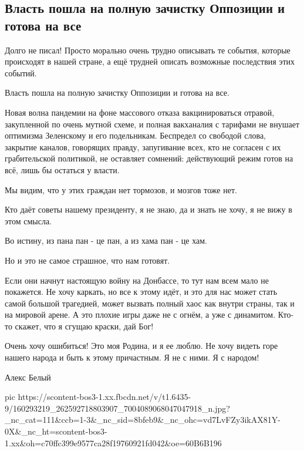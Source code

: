  
 
 
 
 

\subsection{Власть пошла на полную зачистку Оппозиции и готова на все}

Долго не писал! Просто морально очень трудно описывать те события, которые
происходят в нашей стране, а ещё трудней описать возможные последствия этих
событий.  

Власть пошла на полную зачистку Оппозиции и готова на все.

Новая волна пандемии на фоне массового отказа вакцинироваться отравой,
закупленной по очень мутной схеме, и полная вакханалия с тарифами не внушает
оптимизма Зеленскому и его подельникам. Беспредел со свободой слова, закрытие
каналов, говорящих правду, запугивание всех, кто не согласен с их грабительской
политикой, не оставляет сомнений: действующий режим готов на всё, лишь бы
остаться у власти. 

Мы видим, что у этих граждан нет тормозов, и мозгов тоже нет. 

Кто даёт советы нашему президенту, я не знаю, да и знать не хочу, я не вижу в
этом смысла.  

Во истину, из пана пан - це пан, а из хама пан - це хам.  

Но и это не самое страшное, что нам готовят. 

Если они начнут настоящую войну на Донбассе, то тут нам всем мало не покажется.
Не хочу каркать, но все к этому идёт, и это для нас может стать самой большой
трагедией, может вызвать полный хаос как внутри страны, так и на мировой арене.
А это плохие игры даже не с огнём, а уже с динамитом. Кто-то скажет, что я
сгущаю краски, дай Бог! 

Очень хочу ошибиться! Это моя Родина, и я ее люблю. Не хочу видеть горе нашего
народа и быть к этому причастным. Я не с ними. Я с народом!

Алекс Белый


\ifcmt
  pic https://scontent-bos3-1.xx.fbcdn.net/v/t1.6435-9/160293219_262592718803907_7004089068047047918_n.jpg?_nc_cat=111&ccb=1-3&_nc_sid=8bfeb9&_nc_ohc=vd7LvFZy3ikAX81Y-0X&_nc_ht=scontent-bos3-1.xx&oh=c70ffc399e9577ca28f19760921fd042&oe=60B6B196
\fi

